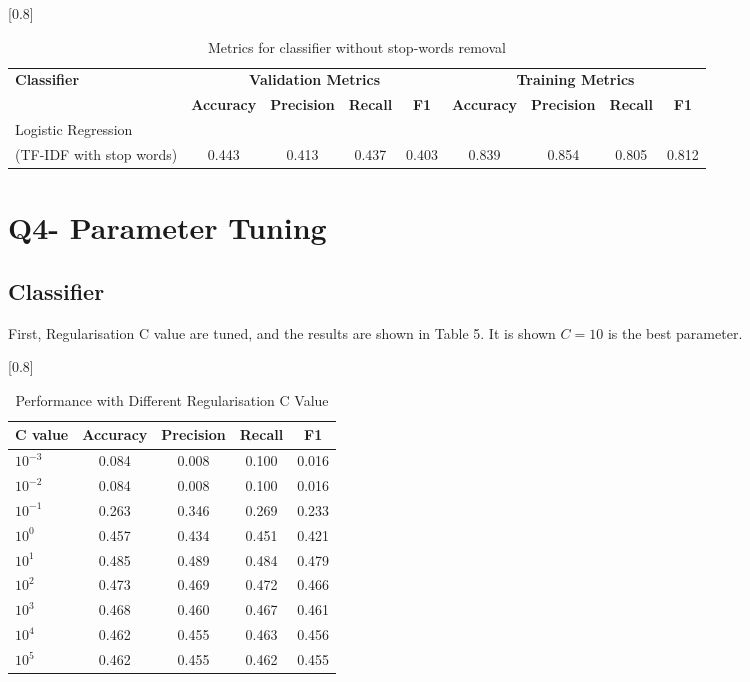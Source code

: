 \documentclass[a4paper,11pt]{article}
\begin{document}
\begin{table}[htbp]
    \centering
    \caption{Metrics for classifier without stop-words removal}
    \small
    \scalebox{0.8}[0.8]{
    \begin{tabular}{l|cccc|cccc}
        \hline
        \textbf{Classifier} & \multicolumn{4}{c|}{\textbf{Validation Metrics}} & \multicolumn{4}{c}{\textbf{Training Metrics}} \\
        & \textbf{Accuracy} & \textbf{Precision} & \textbf{Recall} & \textbf{F1} & \textbf{Accuracy} & \textbf{Precision} & \textbf{Recall} & \textbf{F1} \\
        \hline 
        Logistic Regression &&&&&& \\ (TF-IDF with stop words) & 0.443 & 0.413 & 0.437 & 0.403 & 0.839 & 0.854 & 0.805 & 0.812 \\
        \hline
    \end{tabular}
    }
\end{table}






\section{Q4- Parameter Tuning}
\subsection{Classifier}
First, Regularisation C value are tuned, and the results are shown in Table 5.
It is shown $C=10$ is the best parameter.%

\begin{table}[htbp]
    \centering
    \caption{Performance with Different Regularisation C Value}
    \small
    \scalebox{0.8}[0.8]{
    \begin{tabular}{l|cccc}
        C value & Accuracy & Precision & Recall & F1 \\ \hline 
        $10^{-3}$ &0.084 & 0.008& 0.100& 0.016\\ 
        $10^{-2}$ &0.084 &0.008 &0.100 &0.016\\ 
        $10^{-1}$ &0.263 &0.346 &0.269 &0.233\\ 
        $10^{0}$  &0.457 &0.434 &0.451 &0.421\\ 
        \rowcolor[rgb]{0.9,0.9,0}$10^{1}$  &0.485 &0.489 &0.484 &0.479\\ 
        $10^{2}$  &0.473 &0.469 &0.472 &0.466\\ 
        $10^{3}$  &0.468 &0.460 &0.467 &0.461\\ 
        $10^{4}$  &0.462 &0.455 &0.463 &0.456\\ 
        $10^{5}$  &0.462 &0.455 &0.462 &0.455\\ 

    \end{tabular}
    }
\end{table}
\end{document}
